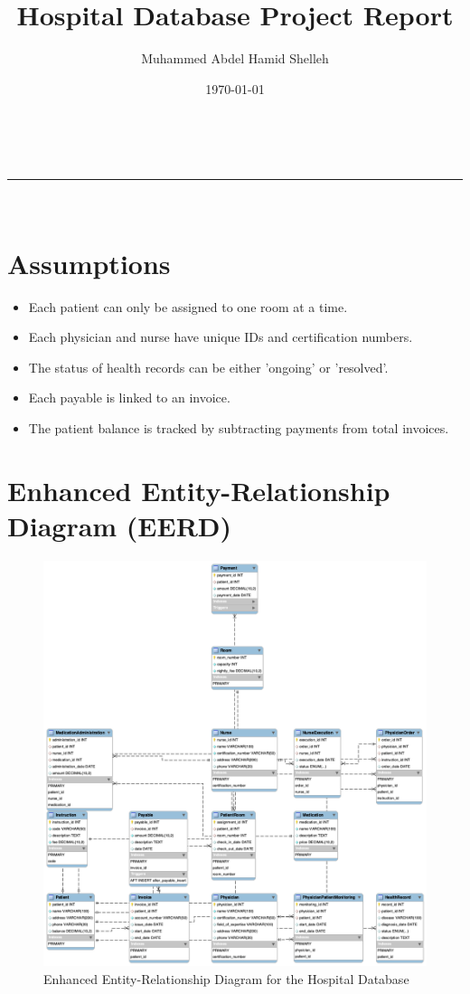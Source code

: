 \documentclass[a4paper,11pt]{article}
\title{Hospital Database Project Report}
\author{Muhammed Abdel Hamid Shelleh}
\date{\today}
\makeatletter
\newcommand{\linia}{\rule{\linewidth}{0.5pt}}
\theoremstyle{mytheor}
\renewcommand{\maketitle}{
\begin{center}
\vspace{2ex}
{\huge \textsc{\@title}}
\vspace{1ex}
\\
\linia\\
\@author \hfill \@date
\vspace{4ex}
\end{center}
}
\makeatother
\begin{document}
\maketitle

\section{Assumptions}
\begin{itemize}
    \item Each patient can only be assigned to one room at a time.
    \item Each physician and nurse have unique IDs and certification numbers.
    \item The status of health records can be either 'ongoing' or 'resolved'.
    \item Each payable is linked to an invoice.
    \item The patient balance is tracked by subtracting payments from total invoices.
\end{itemize}

\section{Enhanced Entity-Relationship Diagram (EERD)}
\begin{figure}[H]
    \centering
    \includegraphics[width=1\textwidth]{hospital.png}
    \caption{Enhanced Entity-Relationship Diagram for the Hospital Database}
\end{figure}
\end{document}
